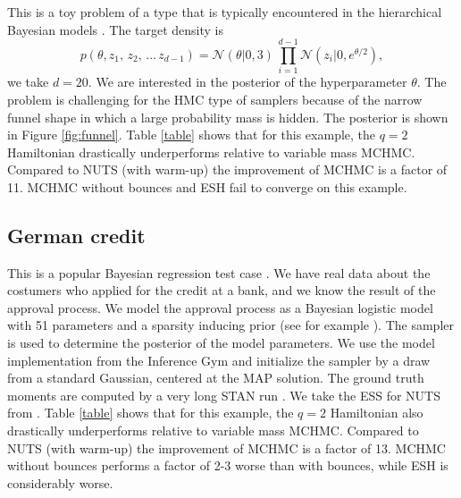 \documentclass[twoside,11pt]{article}
\begin{document}
    This is a toy problem of a type that is typically encountered in the hierarchical Bayesian models \citep{HierarchicalWebsite}. The target density is \citep{NealHandbook}
    \begin{equation} \nonumber
        p(\theta, z_1,\, z_2,\, ... \, z_{d-1})= \mathcal{N}(\theta \vert 0, 3) \, \prod_{i = 1}^{d-1} \mathcal{N}(z_i \vert 0, e^{\theta / 2}),
    \end{equation}
    we take $d = 20$. We are interested in the posterior of the hyperparameter $\theta$. The problem is challenging for the HMC type of samplers because of the narrow funnel shape in which a large probability mass is hidden.
    The posterior is shown in Figure \ref{fig:funnel}. Table \ref{table} shows that for this example, the $q = 2$ Hamiltonian 
    drastically underperforms relative to variable mass MCHMC. Compared to NUTS (with warm-up) the improvement of MCHMC is a factor of 11. MCHMC without bounces and ESH fail to converge
    on this example.
    
    
\subsection{German credit}
    
    This is a popular Bayesian regression test case \citep{GermanCreditData}. We have real data about the costumers who applied for the credit at a bank, and we know the result of the approval process. We model the approval process as a Bayesian logistic model with 51 parameters and a sparsity inducing prior (see for example \citet{hoffmanGermanCredit}). The sampler is used to determine the posterior of the model parameters. We use the model implementation from the Inference Gym \citep{inferencegym} and initialize the sampler by a draw from a standard Gaussian, centered at the MAP solution. The ground truth moments are computed by a very long STAN run \citep{inferencegym}. We take the ESS for NUTS from \citet{DLMC}.
    Table \ref{table} shows that for this example, the $q = 2$ Hamiltonian also
    drastically underperforms relative to variable mass MCHMC. Compared to NUTS (with warm-up) the improvement of MCHMC is a factor of 13. MCHMC without bounces performs a factor 
    of 2-3 worse than with bounces, while ESH is considerably worse.
\end{document}
